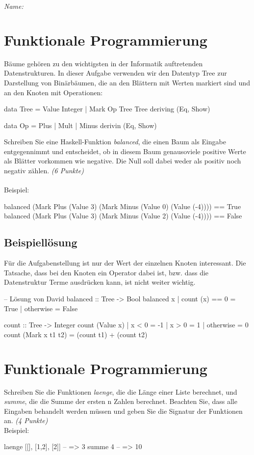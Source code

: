 \documentclass[11pt,a4paper,oneside,ngerman]{scrbook}
\begin{document}
\emph{Name:} \hrulefill


\section{Funktionale Programmierung}
Bäume gehören zu den wichtigsten in der Informatik auftretenden Datenstrukturen. In dieser Aufgabe verwenden wir den Datentyp Tree zur Darstellung von Binärbäumen, die an den Blättern mit Werten markiert sind und an den Knoten mit Operationen:

\begin{code}
    data Tree = 
            Value Integer
          | Mark Op Tree Tree
          deriving (Eq, Show)

    data Op = Plus | Mult | Minus
          derivin (Eq, Show)
\end{code}

Schreiben Sie eine Haskell-Funktion \emph{balanced}, die einen Baum als Eingabe entgegennimmt und entscheidet, ob in diesem Baum genausoviele positive Werte als Blätter vorkommen wie negative. Die Null soll dabei weder als positiv noch negativ zählen. \emph{(6 Punkte)}\\
\\
Beispiel:
\begin{code}
  balanced (Mark Plus (Value 3) (Mark Minus (Value 0) (Value (-4)))) == True
  balanced (Mark Plus (Value 3) (Mark Minus (Value 2) (Value (-4)))) == False
\end{code}

\subsection{Beispiellösung}
Für die Aufgabenstellung ist nur der Wert der einzelnen Knoten interessant. Die Tatsache, dass bei den Knoten ein Operator dabei ist, bzw. dass die Datenstruktur Terme ausdrücken kann, ist nicht weiter wichtig.

\begin{code}
  -- Lösung von David
  balanced :: Tree -> Bool
  balanced x
         | count (x) == 0  = True
         | otherwise       = False

  count :: Tree -> Integer
  count (Value x)
        | x < 0 = -1
        | x > 0 = 1
        | otherwise = 0
  count (Mark x t1 t2) = (count t1) + (count t2)
\end{code}

\newpage


\section{Funktionale Programmierung}
Schreiben Sie die Funktionen \emph{laenge}, die die Länge einer Liste berechnet, und \emph{summe}, die die Summe der ersten n Zahlen berechnet. Beachten Sie, dass alle Eingaben behandelt werden müssen und geben Sie die Signatur der Funktionen an. \emph{(4 Punkte)}\\
Beispiel:
\begin{code}
  laenge [[], [1,2], [2]]     -- => 3
  summe 4                     -- => 10
\end{code}
\end{document}
